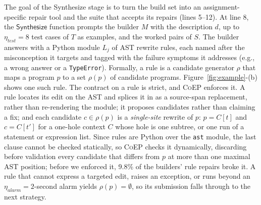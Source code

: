 \documentclass[acmsmall,screen,review,anonymous,nonacm]{acmart}
\newcommand{\tool}{\textsc{CoEP}\xspace}
\newcommand{\aux}[1]{\ensuremath{\mathsf{#1}}}
\newcommand{\V}[1]{\ensuremath{\mathit{#1}}}
\begin{document}
The goal of the Synthesize stage is to turn the build set into an assignment-specific repair tool and the suite that accepts its repairs (lines 5--12). At line 8, the \aux{Synthesize} function prompts the builder $M$ with the description $d$, up to $\eta_{\V{test}} = 8$ test cases of $T$ as examples, and the worked pairs of $S$. The builder answers with a Python module $L_j$ of AST rewrite rules, each named after the misconception it targets and tagged with the failure symptoms it addresses (e.g., a wrong answer or a \texttt{TypeError}). Formally, a rule is a candidate generator $\rho$ that maps a program $p$ to a set $\rho(p)$ of candidate programs. Figure~\ref{fig:example}-(b) shows one such rule. The contract on a rule is strict, and \tool enforces it. A rule locates its edit on the AST and splices it in as a source-span replacement, rather than re-rendering the module; it proposes candidates rather than claiming a fix; and each candidate $c \in \rho(p)$ is a \emph{single-site} rewrite of $p$: $p = C[t]$ and $c = C[t']$ for a one-hole context $C$ whose hole is one subtree, or one run of a statement or expression list. Since rules are Python over the \texttt{ast} module, the last clause cannot be checked statically, so \tool checks it dynamically, discarding before validation every candidate that differs from $p$ at more than one maximal AST position; before we enforced it, 9.8\% of the builders' rule repairs broke it. A rule that cannot express a targeted edit, raises an exception, or runs beyond an $\eta_{\V{alarm}} = 2$-second alarm yields $\rho(p) = \emptyset$, so its submission falls through to the next strategy.
\end{document}
